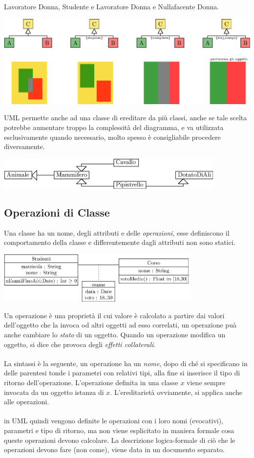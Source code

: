 \documentclass[12pt, letterpaper]{article}
\newcommand{\acc}{\\\hphantom{}\\}
\begin{document}
Lavoratore Donna,
Studente e Lavoratore Donna e
Nullafacente Donna.\begin{center}
    \includegraphics[width=1\textwidth ]{images/criteriDisjointComplete.eps}
\end{center} 
UML permette anche ad una classe di ereditare da più classi, anche se tale scelta potrebbe 
aumentare troppo la complessità del diagramma, e va utilizzata esclusivamente quando necessario, molto spesso 
è consigliabile procedere diversamente.\begin{center}
    \includegraphics[width=0.85\textwidth ]{images/eredMultipla.eps}
\end{center}
\subsection{Operazioni di Classe}
Una classe ha un nome, degli attributi e delle \textit{operazioni}, 
esse definiscono il comportamento della classe e differentemente dagli attributi 
non sono statici.\begin{center}
    \includegraphics[width=0.75\textwidth ]{images/operazione.eps}
\end{center}
Un operazione è una proprietà il cui valore è calcolato a 
partire dai valori dell'oggetto che la invoca od altri oggetti ad esso 
correlati, un operazione puà anche cambiare lo \textit{stato} di un 
oggetto. Quando un operazione modifica un oggetto, si dice che provoca degli 
\textit{effetti collaterali}.\acc 
La sintassi è la seguente, un operazione ha un \textit{nome}, dopo di ché 
si specificano in delle parentesi tonde i parametri con relativi tipi, alla fine 
si inserisce il tipo di ritorno dell'operazione. L'operazione definita in 
 una classe $x$ viene sempre invocata da un oggetto istanza di $x$. L'ereditarietà 
 ovviamente, si applica anche alle operazioni.\acc 
 in UML quindi vengono definite le operazioni con i loro nomi (evocativi), parametri e tipo di ritorno, ma non viene 
 esplicitato in maniera formale cosa queste operazioni devono calcolare. La descrizione logica-formale di ciò che 
 le operazioni devono fare (non come), viene data in un documento separato.
\end{document}

